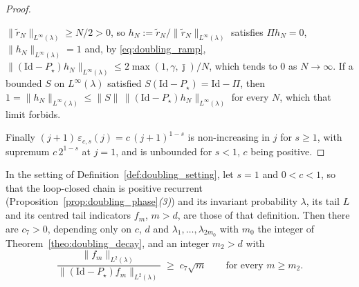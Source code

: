 \begin{proof}
\begin{itemize}
    $\|\tilde r_N\|_{L^\infty(\lambda)}\geq N/2>0$, so
    $h_N:=\tilde r_N/\|\tilde r_N\|_{L^\infty(\lambda)}$ satisfies $\Pi h_N=0$,
    $\|h_N\|_{L^\infty(\lambda)}=1$ and, by \eqref{eq:doubling_ramp},
    $\|(\mathrm{Id}-P_\star)h_N\|_{L^\infty(\lambda)}\leq2\max(1,\gamma,\bar\jmath)/N$, which
    tends to $0$ as $N\rightarrow\infty$. If a bounded $S$ on $L^\infty(\lambda)$ satisfied
    $S(\mathrm{Id}-P_\star)=\mathrm{Id}-\Pi$, then
    $1=\|h_N\|_{L^\infty(\lambda)}\leq\|S\|\,\|(\mathrm{Id}-P_\star)h_N\|_{L^\infty(\lambda)}$
    for every $N$, which that limit forbids.
\end{itemize}
Finally $(j+1)\,\varepsilon_{c,s}(j)=c\,(j+1)^{1-s}$ is non-increasing in $j$ for $s\geq1$,
with supremum $c\,2^{1-s}$ at $j=1$, and is unbounded for $s<1$, $c$ being positive.
\end{proof}

\begin{corollary}\label{cor:doubling_family}
In the setting of Definition~\ref{def:doubling_setting}, let $s=1$ and $0<c<1$, so that the
loop-closed chain is positive recurrent (Proposition~\ref{prop:doubling_phase}\emph{(3)}) and
its invariant probability $\lambda$, its tail $L$ and its centred tail indicators $f_m$,
$m>d$, are those of that definition. Then there are $c_7>0$, depending only on $c$, $d$ and
$\lambda_1,\dots,\lambda_{2m_0}$ with $m_0$ the integer of
Theorem~\ref{theo:doubling_decay}, and an integer $m_2>d$ with
\begin{equation}\label{eq:doubling_explicit}
    \frac{\|f_m\|_{L^2(\lambda)}}
         {\bigl\|\left(\mathrm{Id}-P_\star\right)f_m\bigr\|_{L^2(\lambda)}}
    \;\geq\;c_7\sqrt m\qquad\text{for every }m\geq m_2 .
\end{equation}
\end{corollary}

